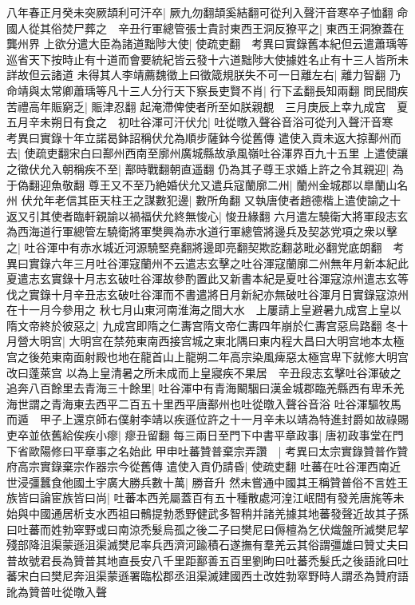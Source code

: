 八年春正月癸未突厥頡利可汗卒|{
	厥九勿翻頡奚結翻可從刋入聲汗音寒卒子恤翻}
命國人從其俗焚尸葬之　辛丑行軍總管張士貴討東西王洞反獠平之|{
	東西王洞獠蓋在龔州界}
上欲分遣大臣為諸道黜陟大使|{
	使疏吏翻　考異曰實錄舊本紀但云遣蕭瑀等巡省天下按時止有十道而會要統紀皆云發十六道黜陟大使據姓名止有十三人皆所未詳故但云諸道}
未得其人李靖薦魏徵上曰徵箴規朕失不可一日離左右|{
	離力智翻}
乃命靖與太常卿蕭瑀等凡十三人分行天下察長吏賢不肖|{
	行下孟翻長知兩翻}
問民間疾苦禮高年賑窮乏|{
	賑津忍翻}
起淹滯俾使者所至如朕親覩　三月庚辰上幸九成宫　夏五月辛未朔日有食之　初吐谷渾可汗伏允|{
	吐從暾入聲谷音浴可從刋入聲汗音寒　考異曰實錄十年立諾曷鉢詔稱伏允為順步薩鉢今從舊傳}
遣使入貢未返大掠鄯州而去|{
	使疏吏翻宋白曰鄯州西南至廓州廣城縣故承風嶺吐谷渾界百九十五里}
上遣使讓之徵伏允入朝稱疾不至|{
	鄯時戰翻朝直遥翻}
仍為其子尊王求婚上許之令其親迎|{
	為于偽翻迎魚敬翻}
尊王又不至乃絶婚伏允又遣兵寇蘭廓二州|{
	蘭州金城郡以臯蘭山名州}
伏允年老信其臣天柱王之謀數犯邊|{
	數所角翻}
又執唐使者趙德楷上遣使諭之十返又引其使者臨軒親諭以禍福伏允終無悛心|{
	悛丑緣翻}
六月遣左驍衛大將軍段志玄為西海道行軍總管左驍衛將軍樊興為赤水道行軍總管將邊兵及契苾党項之衆以擊之|{
	吐谷渾中有赤水城近河源驍堅堯翻將邊即亮翻契欺訖翻苾毗必翻党底朗翻　考異曰實錄六年三月吐谷渾寇蘭州不云遣志玄擊之吐谷渾寇蘭廓二州無年月新本紀此夏遣志玄實錄十月志玄破吐谷渾故參酌置此又新書本紀是夏吐谷渾寇涼州遣志玄等伐之實錄十月辛丑志玄破吐谷渾而不書遣將日月新紀亦無破吐谷渾月日實錄寇涼州在十一月今參用之}
秋七月山東河南淮海之間大水　上屢請上皇避暑九成宫上皇以隋文帝終於彼惡之|{
	九成宫即隋之仁夀宫隋文帝仁夀四年崩於仁夀宫惡烏路翻}
冬十月營大明宫|{
	大明宫在禁苑東南西接宫城之東北隅曰東内程大昌曰大明宫地本太極宫之後苑東南面射殿也地在龍首山上龍朔二年高宗染風痺惡太極宫卑下就修大明宫改曰蓬萊宫}
以為上皇清暑之所未成而上皇寢疾不果居　辛丑段志玄擊吐谷渾破之追奔八百餘里去青海三十餘里|{
	吐谷渾中有青海闞駰曰漢金城郡臨羌縣西有卑禾羌海世謂之青海東去西平二百五十里西平唐鄯州也吐從暾入聲谷音浴}
吐谷渾驅牧馬而遁　甲子上還京師右僕射李靖以疾遜位許之十一月辛未以靖為特進封爵如故祿賜吏卒並依舊給俟疾小瘳|{
	瘳丑留翻}
每三兩日至門下中書平章政事|{
	唐初政事堂在門下省歐陽修曰平章事之名始此}
甲申吐蕃贊普棄宗弄讚　|{
	考異曰太宗實錄贊普作贊府高宗實錄棄宗作器宗今從舊傳}
遣使入貢仍請昏|{
	使疏吏翻}
吐蕃在吐谷渾西南近世浸彊蠶食他國土宇廣大勝兵數十萬|{
	勝音升}
然未嘗通中國其王稱贊普俗不言姓王族皆曰論宦族皆曰尚|{
	吐蕃本西羌屬蓋百有五十種散處河湟江岷間有發羌唐旄等未始與中國通居析支水西祖曰鶻提勃悉野健武多智稍并諸羌據其地蕃發聲近故其子孫曰吐蕃而姓勃窣野或曰南涼禿髮烏孤之後二子曰樊尼曰傉檀為乞伏熾盤所滅樊尼挈殘部降沮渠蒙遜沮渠滅樊尼率兵西濟河踰積石遂撫有羣羌云其俗謂彊雄曰贊丈夫曰普故號君長為贊普其地直長安八千里距鄯善五百里劉昫曰吐蕃禿髮氏之後語訛曰吐蕃宋白曰樊尼奔沮渠蒙遜署臨松郡丞沮渠滅建國西土改姓勃窣野時人謂丞為贊府語訛為贊普吐從暾入聲}
